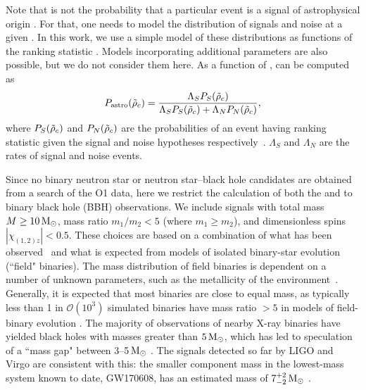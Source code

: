 Note that \tdr{} is not the probability that a particular event is a signal of astrophysical origin \pastro{}. For that, one needs to model the distribution of signals and noise at a given \rankingstat{}. In this work, we use a simple model of these distributions as functions of the ranking statistic \rankingstat{}. Models incorporating additional parameters are also possible, but we do not consider them here. As a function of \rankingstat, \pastro{} can be computed as
%
\begin{equation}
P_{\mathrm{astro}}(\tilde{\rho}_c) = \frac{\Lambda_S P_S(\tilde{\rho}_c)}{\Lambda_S P_S(\tilde{\rho}_c) + \Lambda_N P_N(\tilde{\rho}_c)},
\end{equation} 
%
where $P_S(\tilde{\rho}_c)$ and $P_N(\tilde{\rho}_c)$ are the probabilities of an event having ranking statistic \rankingstat{} 
given the signal and noise hypotheses respectively~\citep{2009MNRAS.396..165G,Farr:2015,Abbott:2016nhf}. $\Lambda_S$ and $\Lambda_N$ are the rates of signal and noise events.

Since no binary neutron star or neutron star--black hole candidates are obtained from a search of the O1 data, here we restrict the calculation of both the \tdr{} and \pastro{} to binary black hole (BBH) observations.
We include signals with total mass $M \geq 10\,\mathrm{M}_{\odot}$, mass ratio $m_1/m_2 < 5$ (where $m_1 \geq m_2$),
and dimensionless spins $|\chi_{(1,2)z}| <
0.5$. These choices are based on a combination of what has been observed~\citep{TheLIGOScientific:2016pea,GW170104,GW170814,Abbott:2017gyy} and
what is expected from models of isolated binary-star evolution (``field"
binaries). The mass distribution of field binaries is dependent on a number of
unknown parameters, such as the metallicity of the environment~\citep{Belczynski:2014iua}. Generally, it is expected that most binaries are close to equal mass, as typically less than 1
in $\mathcal{O}(10^{3})$ simulated binaries have mass ratio $> 5$ in models of
field-binary evolution \citep{Dominik:2014yma}.  The majority of observations of
nearby X-ray binaries have yielded black holes with masses greater than
$5\,\mathrm{M}_{\odot}$, which has led to speculation of a ``mass gap" between
3--5$\,\mathrm{M}_{\odot}$ \citep{Ozel:2010su, Farr:2010tu, Kreidberg:2012ud}. The signals
detected so far by LIGO and Virgo are consistent with this: the smaller component mass
in the lowest-mass system known to date, GW170608, has an estimated mass of
$7^{+2}_{-2}\,\mathrm{M}_{\odot}$ \citep{Abbott:2017gyy}.


